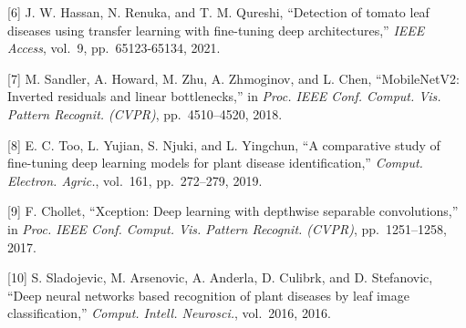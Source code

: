 \documentclass[
]{article}
\begin{document}
{[}6{]} J. W. Hassan, N. Renuka, and T. M. Qureshi, ``Detection of
tomato leaf diseases using transfer learning with fine-tuning deep
architectures,'' \emph{IEEE Access}, vol.~9, pp.~65123-65134, 2021.

{[}7{]} M. Sandler, A. Howard, M. Zhu, A. Zhmoginov, and L. Chen,
``MobileNetV2: Inverted residuals and linear bottlenecks,'' in
\emph{Proc. IEEE Conf. Comput. Vis. Pattern Recognit. (CVPR)},
pp.~4510--4520, 2018.

{[}8{]} E. C. Too, L. Yujian, S. Njuki, and L. Yingchun, ``A comparative
study of fine-tuning deep learning models for plant disease
identification,'' \emph{Comput. Electron. Agric.}, vol.~161,
pp.~272--279, 2019.

{[}9{]} F. Chollet, ``Xception: Deep learning with depthwise separable
convolutions,'' in \emph{Proc. IEEE Conf. Comput. Vis. Pattern Recognit.
(CVPR)}, pp.~1251--1258, 2017.

{[}10{]} S. Sladojevic, M. Arsenovic, A. Anderla, D. Culibrk, and D.
Stefanovic, ``Deep neural networks based recognition of plant diseases
by leaf image classification,'' \emph{Comput. Intell. Neurosci.},
vol.~2016, 2016.
\end{document}
